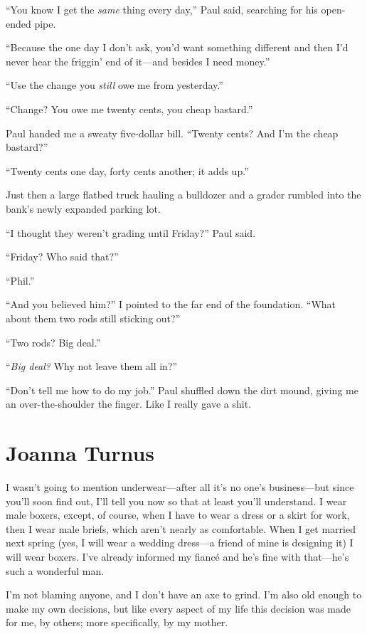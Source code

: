 ``You know I get the \emph{same} thing every day,'' Paul said, searching
for his open-ended pipe. ~

``Because the one day I don't ask, you'd want something different and
then I'd never hear the friggin' end of it---and besides I need money.''

``Use the change you \emph{still} owe me from yesterday.''

``Change? You owe me twenty cents, you cheap bastard.''

Paul handed me a sweaty five-dollar bill. ``Twenty cents? And I'm the
cheap bastard?''

``Twenty cents one day, forty cents another; it adds up.''

Just then a large flatbed truck hauling a bulldozer and a grader rumbled
into the bank's newly expanded parking lot.

``I thought they weren't grading until Friday?'' Paul said. ~~~~

``Friday? Who said that?''

``Phil.''

``And you believed him?'' I pointed to the far end of the foundation.
``What about them two rods still sticking out?''

``Two rods? Big deal.''

``\emph{Big deal?} Why not leave them all in?''

``Don't tell me how to do my job.'' Paul shuffled down the dirt mound,
giving me an over-the-shoulder the finger. Like I really gave a shit.

\chapter{Joanna Turnus}

\titlemark

I wasn't going to mention underwear---after all it's no one's
business---but since you'll soon find out, I'll tell you now so that at
least you'll understand. I wear male boxers, except, of course, when I
have to wear a dress or a skirt for work, then I wear male briefs, which
aren't nearly as comfortable. When I get married next spring (yes, I
will wear a wedding dress---a friend of mine is designing it) I will
wear boxers. I've already informed my fiancé and he's fine with
that---he's such a wonderful man.

I'm not blaming anyone, and I don't have an axe to grind. I'm also old
enough to make my own decisions, but like every aspect of my life this
decision was made for me, by others; more specifically, by my mother.

